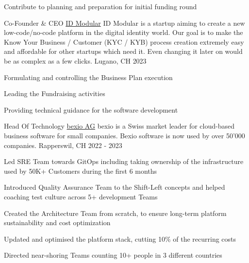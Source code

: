\begin{cventries}
{\begin{cvitems}
      \item {Contribute to planning and preparation for initial funding round}
    \end{cvitems}
  }
  \cventry
    {Co-Founder \& CEO} %
    {\href{https://www.idmodular.com}{ID Modular}} %
    {ID Modular is a startup aiming to create a new low-code/no-code platform in the digital identity world. Our goal is to make the Know Your Business / Customer (KYC / KYB) process creation extremely easy and affordable for other startups which need it. Even changing it later on would be as complex as a few clicks.} %
    {Lugano, CH} %
    {2023} %
    {
      \begin{cvitems} %
        \item {Formulating and controlling the Business Plan execution}
        \item {Leading the Fundraising activities}
        \item {Providing technical guidance for the software development}
      \end{cvitems}
    }
  \cventry
    {Head Of Technology} %
    {\href{https://www.bexio.com}{bexio AG}} %
    {bexio is a Swiss market leader for cloud-based business software for small companies. Bexio software is now used by over 50'000 companies.} %
    {Rapperswil, CH} %
    {2022 - 2023} %
    {
      \begin{cvitems} %
        \item {Led SRE Team towards GitOps including taking ownership of the infrastructure used by 50K+ Customers during the first 6 months}
        \item {Introduced Quality Assurance Team to the Shift-Left concepts and helped coaching test culture across 5+ development Teams}
        \item {Created the Architecture Team from scratch, to ensure long-term platform sustainability and cost optimization}
        \item {Updated and optimised the platform stack, cutting 10\% of the recurring costs}
        \item {Directed near-shoring Teams counting 10+ people in 3 different countries}
      \end{cvitems}
    }


\end{cventries}
